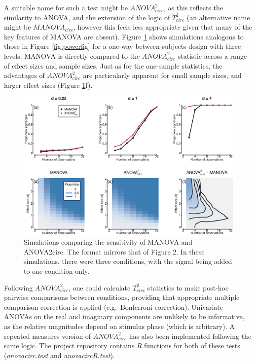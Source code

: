\documentclass[]{article}
\begin{document}
A suitable name for such a test might be \({ANOVA}^2_{circ}\), as this reflects the similarity to ANOVA, and the extension of the logic of \(T^2_{circ}\) (an alternative name might be \(MANOVA_{circ}\), however this feels less appropriate given that many of the key features of MANOVA are absent). Figure \ref{fig:powerfig2} shows simulations analogous to those in Figure \ref{fig:powerfig} for a one-way between-subjects design with three levels. MANOVA is directly compared to the \({ANOVA}^2_{circ}\) statistic across a range of effect sizes and sample sizes. Just as for the one-sample statistics, the advantages of \({ANOVA}^2_{circ}\) are particularly apparent for small sample sizes, and larger effect sizes (Figure \ref{fig:powerfig2}f).

\begin{figure}

{\centering \includegraphics{manuscript_files/figure-latex/powerfig2-1} 

}

\caption{Simulations comparing the sensitivity of MANOVA and ANOVA2circ. The format mirrors that of Figure 2. In these simulations, there were three conditions, with the signal being added to one condition only.}\label{fig:powerfig2}
\end{figure}

Following \({ANOVA}^2_{circ}\), one could calculate \(T^2_{circ}\) statistics to make post-hoc pairwise comparisons between conditions, providing that appropriate multiple comparison correction is applied (e.g.~Bonferroni correction). Univariate ANOVAs on the real and imaginary components are unlikely to be informative, as the relative magnitudes depend on stimulus phase (which is arbitrary). A repeated measures version of \({ANOVA}^2_{circ}\) has also been implemented following the same logic. The project repository contains \emph{R} functions for both of these tests (\emph{anovacirc.test} and \emph{anovacircR.test}).
\end{document}
